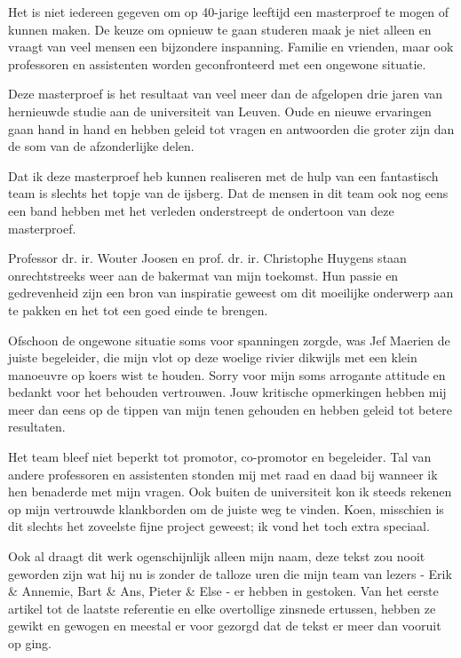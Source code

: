 
\begin{preface}

Het is niet iedereen gegeven om op 40-jarige leeftijd een masterproef te mogen
of kunnen maken. De keuze om opnieuw te gaan studeren maak je niet alleen en
vraagt van veel mensen een bijzondere inspanning. Familie en vrienden, maar ook
professoren en assistenten worden geconfronteerd met een ongewone situatie.

Deze masterproef is het resultaat van veel meer dan de afgelopen drie jaren van
hernieuwde studie aan de universiteit van Leuven. Oude en nieuwe ervaringen
gaan hand in hand en hebben geleid tot vragen en antwoorden die groter zijn dan
de som van de afzonderlijke delen.

Dat ik deze masterproef heb kunnen realiseren met de hulp van een fantastisch
team is slechts het topje van de ijsberg. Dat de mensen in dit team ook nog
eens een band hebben met het verleden onderstreept de ondertoon van deze
masterproef.

Professor dr. ir. Wouter Joosen en prof. dr. ir. Christophe Huygens staan
onrechtstreeks weer aan de bakermat van mijn toekomst. Hun passie en
gedrevenheid zijn een bron van inspiratie geweest om dit moeilijke onderwerp
aan te pakken en het tot een goed einde te brengen.

Ofschoon de ongewone situatie soms voor spanningen zorgde, was Jef Maerien de
juiste begeleider, die mijn vlot op deze woelige rivier dikwijls met een klein
manoeuvre op koers wist te houden. Sorry voor mijn soms arrogante attitude en
bedankt voor het behouden vertrouwen. Jouw kritische opmerkingen hebben mij
meer dan eens op de tippen van mijn tenen gehouden en hebben geleid tot betere
resultaten.

Het team bleef niet beperkt tot promotor, co-promotor en begeleider. Tal van
andere professoren en assistenten stonden mij met raad en daad bij wanneer ik
hen benaderde met mijn vragen. Ook buiten de universiteit kon ik steeds rekenen
op mijn vertrouwde klankborden om de juiste weg te vinden. Koen, misschien is
dit slechts het zoveelste fijne project geweest; ik vond het toch extra
speciaal.

Ook al draagt dit werk ogenschijnlijk alleen mijn naam, deze tekst zou nooit
geworden zijn wat hij nu is zonder de talloze uren die mijn team van lezers -
Erik \& Annemie, Bart \& Ans, Pieter \& Else - er hebben in gestoken. Van het
eerste artikel tot de laatste referentie en elke overtollige zinsnede ertussen,
hebben ze gewikt en gewogen en meestal er voor gezorgd dat de tekst er meer dan
vooruit op ging.


\end{preface}
